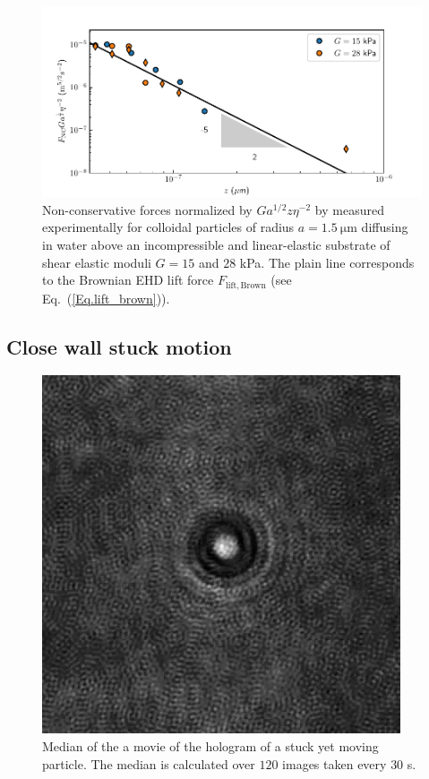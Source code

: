 \begin{figure}[H]
	\centering
	\includegraphics{02_body/chapter4/images/EHD_forces/EHD_force_rescale.pdf}
	\caption{Non-conservative forces  normalized by $ Ga^{1/2}z\eta ^{-2}$ by measured experimentally for colloidal particles of radius $a=1.5 ~\mathrm{\mu m}$ diffusing in water above an incompressible and linear-elastic substrate of shear elastic moduli $G=15$ and $28$ kPa. The plain line corresponds to the Brownian \gls{EHD} lift force $F_\mathrm{lift, Brown}$ (see Eq.~(\ref{Eq.lift_brown})).~\href{https://github.com/eXpensia/Confined-Brownian-Motion/blob/main/02_body/chapter4/images/EHD_forces/global_EHD_plot.ipynb}{\faGithub}}
	\label{fig.ncforcenormalized}
\end{figure}


\subsection{Close wall stuck motion}

\begin{figure}[H]
	\centering
	\includegraphics[scale=0.5]{02_body/chapter4/images/stucked_particle/ghost.png}
	\caption{Median of the a movie of the hologram of a stuck yet moving particle. The median is calculated over $120$ images taken every $30$ s.}
	\label{fig.ghost_stucked}
\end{figure}

